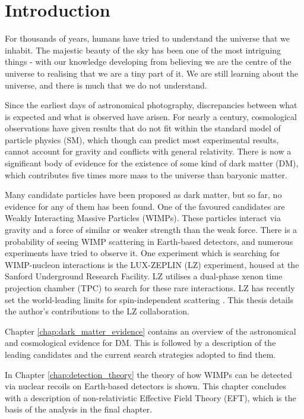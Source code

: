 \chapter{Introduction}
\par
For thousands of years, humans have tried to understand the universe that we inhabit.
The majestic beauty of the sky has been one of the most intriguing things - with our knowledge developing from believing we are the centre of the universe to realising that we are a tiny part of it.
We are still learning about the universe, and there is much that we do not understand.
\par
Since the earliest days of astronomical photography, discrepancies between what is expected and what is observed have arisen.
For nearly a century, cosmological observations have given results that do not fit within the standard model of particle physics (SM), which though can predict most experimental results, cannot account for gravity and conflicts with general relativity. 
There is now a significant body of evidence for the existence of some kind of dark matter (DM), which contributes five times more mass to the universe than baryonic matter.
\par
Many candidate particles have been proposed as dark matter, but so far, no evidence for any of them has been found.
One of the favoured candidates are Weakly Interacting Massive Particles (WIMPs).
These particles interact via gravity and a force of similar or weaker strength than the weak force.
There is a probability of seeing WIMP scattering in Earth-based detectors, and numerous experiments have tried to observe it.
One experiment which is searching for WIMP-nucleon interactions is the LUX-ZEPLIN (LZ) experiment, housed at the Sanford Underground Research Facility.
LZ utilises a dual-phase xenon time projection chamber (TPC) to search for these rare interactions.
LZ has recently set the world-leading limits for spin-independent scattering \cite{lz_ws_sr1_ref}.
This thesis details the author's contributions to the LZ collaboration.

\par
Chapter \ref{chap:dark_matter_evidence} contains an overview of the astronomical and cosmological evidence for DM.
This is followed by a description of the leading candidates and the current search strategies adopted to find them.

\par
In Chapter \ref{chap:detection_theory} the theory of how WIMPs can be detected via nuclear recoils on Earth-based detectors is shown.
This chapter concludes with a description of non-relativistic Effective Field Theory (EFT), which is the basis of the analysis in the final chapter.

